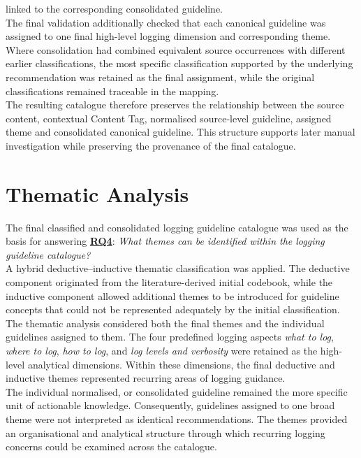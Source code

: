 linked to the corresponding consolidated guideline.
\\
The final validation additionally checked that each canonical guideline was
assigned to one final high-level logging dimension and corresponding theme.
Where consolidation had combined equivalent source occurrences with different
earlier classifications, the most specific classification supported by the
underlying recommendation was retained as the final assignment, while the
original classifications remained traceable in the mapping.
\\
The resulting catalogue therefore preserves the relationship between the 
source content, contextual Content Tag, normalised source-level guideline, assigned
theme and consolidated canonical guideline. This structure supports later manual
investigation while preserving the provenance of the final catalogue.

\section{Thematic Analysis}
\label{sec:meth_thematic_analysis}

The final classified and consolidated logging guideline catalogue was used as the
basis for answering \hyperref[table:t1rq]{\textbf{RQ4}}:
\textit{What themes can be identified within the logging guideline catalogue?}
\\
A hybrid deductive–inductive thematic classification was applied. The deductive
component originated from the literature-derived initial codebook, while the inductive
component allowed additional themes to be introduced for guideline concepts that could
not be represented adequately by the initial classification.
\\
The thematic analysis considered both the final themes and the individual guidelines
assigned to them. The four predefined logging aspects \textit{what to log},
\textit{where to log}, \textit{how to log}, and \textit{log levels and verbosity}
were retained as the high-level analytical dimensions. Within these dimensions, the
final deductive and inductive themes represented recurring areas of logging guidance.
\\
The individual normalised, or consolidated guideline remained the more specific unit of
actionable knowledge. Consequently, guidelines assigned to one broad theme were not
interpreted as identical recommendations. The themes provided an organisational and
analytical structure through which recurring logging concerns could be examined across
the catalogue.


